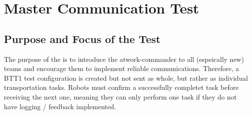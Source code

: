 
\newpage
\section{Master Communication Test}

\subsection{Purpose and Focus of the Test}
The purpose of the  is to introduce the atwork-commander to all (espeically new) teams and encourage them to implement reliable communications.
Therefore, a BTT1 test configuration is created but not sent as whole, but rather as individual transportation tasks.
Robots must confirm a successfully completet task before receiving the next one, meaning they can only perform one task if they do not have logging / feedback implemented.
